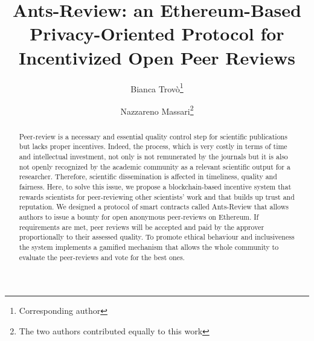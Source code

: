 \documentclass[runningheads]{llncs}
\begin{document}
%
\title{Ants-Review: an Ethereum-Based Privacy-Oriented Protocol for Incentivized Open Peer Reviews}
%
%
\author{Bianca Trovò\thanks{Corresponding author}\and
Nazzareno Massari\thanks{The two authors contributed equally to this work}}
%
%
%
\maketitle              %
%
\begin{abstract}
Peer-review is a necessary and essential quality control step for scientific publications but lacks proper  incentives. Indeed, the process, which is very costly in terms of time and intellectual investment, not only is not remunerated by the journals but it is also not openly recognized by the academic community as a relevant scientific output for a researcher. Therefore, scientific dissemination is affected in timeliness, quality and fairness. Here, to solve this issue, we propose a blockchain-based incentive system that rewards scientists for peer-reviewing other scientists’ work and that builds up trust and reputation. We designed a protocol of smart contracts called Ants-Review that allows authors to issue a bounty for open anonymous peer-reviews on Ethereum. If requirements are met, peer reviews will be accepted and paid by the approver proportionally to their assessed quality. To promote ethical behaviour and inclusiveness the system implements a gamified mechanism that allows the whole community to evaluate the peer-reviews and vote for the best ones.
\end{abstract}
%
%
\end{document}
